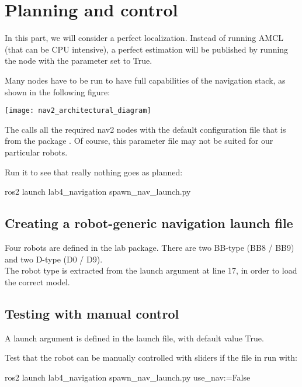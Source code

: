 \documentclass{ecnreport}
\begin{document}
\section{Planning and control}

In this part, we will consider a perfect localization. Instead of running AMCL (that can be CPU intensive), a perfect estimation 
will be published by running the  node with the parameter  set to True.

Many nodes have to be run to have full capabilities of the navigation stack, as shown in the following figure:
\begin{center}
 \texttt{[image: nav2\_architectural\_diagram]}
\end{center}

The  calls all the required nav2 nodes with the default configuration file that is  from the package . Of course, this parameter file may not be suited for our particular robots.

Run it to see that really nothing goes as planned:
\begin{bashcodelarge}
 ros2 launch lab4_navigation spawn_nav_launch.py
\end{bashcodelarge}

\subsection{Creating a robot-generic navigation launch file}

Four robots are defined in the lab package. There are two BB-type (BB8 / BB9) and two D-type (D0 / D9).\\
The robot type is extracted from the  launch argument at line 17, in order to load the correct model.

\subsection{Testing with manual control}

A launch argument  is defined in the launch file, with default value True.

Test that the robot can be manually controlled with sliders if the file in run with:
\begin{bashcodelarge}
 ros2 launch lab4_navigation spawn_nav_launch.py use_nav:=False
\end{bashcodelarge}
\end{document}
